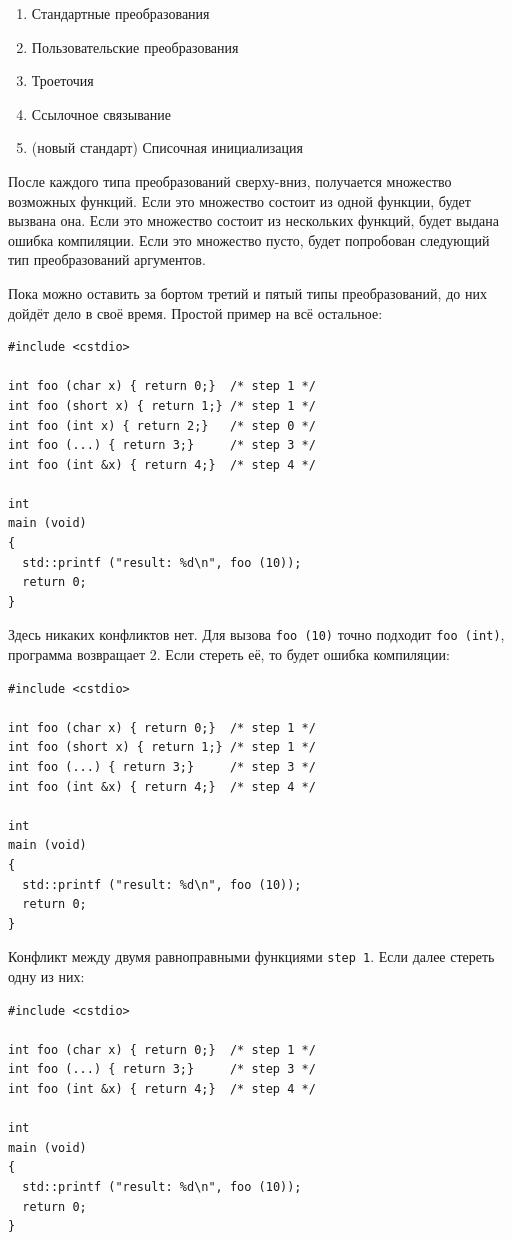 \documentclass[a4paper,12pt,oneside]{article}
\begin{document}
\begin{enumerate}
\item Стандартные преобразования
\item Пользовательские преобразования
\item Троеточия
\item Ссылочное связывание
\item (новый стандарт) Списочная инициализация
\end{enumerate}

После каждого типа преобразований сверху-вниз, получается множество возможных функций. Если это множество состоит из одной функции, будет вызвана она. Если это множество состоит из нескольких функций, будет выдана ошибка компиляции. Если это множество пусто, будет попробован следующий тип преобразований аргументов.

Пока можно оставить за бортом третий и пятый типы преобразований, до них дойдёт дело в своё время. Простой пример на всё остальное:

\begin{lstlisting}
#include <cstdio>

int foo (char x) { return 0;}  /* step 1 */
int foo (short x) { return 1;} /* step 1 */
int foo (int x) { return 2;}   /* step 0 */
int foo (...) { return 3;}     /* step 3 */
int foo (int &x) { return 4;}  /* step 4 */

int
main (void)
{
  std::printf ("result: %d\n", foo (10));
  return 0;
}
\end{lstlisting}

Здесь никаких конфликтов нет. Для вызова \lstinline!foo (10)! точно подходит \lstinline!foo (int)!, программа возвращает 2.
Если стереть её, то будет ошибка компиляции:

\begin{lstlisting}
#include <cstdio>

int foo (char x) { return 0;}  /* step 1 */
int foo (short x) { return 1;} /* step 1 */
int foo (...) { return 3;}     /* step 3 */
int foo (int &x) { return 4;}  /* step 4 */

int
main (void)
{
  std::printf ("result: %d\n", foo (10));
  return 0;
}
\end{lstlisting}

Конфликт между двумя равноправными функциями \lstinline!step 1!. Если далее стереть одну из них:

\begin{lstlisting}
#include <cstdio>

int foo (char x) { return 0;}  /* step 1 */
int foo (...) { return 3;}     /* step 3 */
int foo (int &x) { return 4;}  /* step 4 */

int
main (void)
{
  std::printf ("result: %d\n", foo (10));
  return 0;
}
\end{lstlisting}
\end{document}
